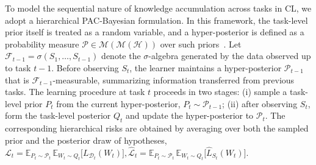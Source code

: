 \documentclass{article}
\theoremstyle{plain}
\theoremstyle{definition}
\theoremstyle{remark}
\begin{document}
To model the sequential nature of knowledge accumulation across tasks in CL, we adopt a hierarchical PAC‑Bayesian formulation. In this framework, the task-level prior itself is treated as a random variable, and a hyper-posterior is defined as a probability measure $\mathcal P \in \mathcal M(\mathcal M(\mathcal H))$ over such priors~\citep{pentinaPACBayesianBoundLifelong2014,JMLR:v24:22-1254}.
Let $\mathcal F_{t-1}=\sigma(S_1,\dots,S_{t-1})$ denote the $\sigma$-algebra generated by the data observed up to task $t-1$. 
Before observing $S_t$, the learner maintains a hyper-posterior $\mathcal P_{t-1}$ that is $\mathcal F_{t-1}$-measurable, summarizing information transferred from previous tasks. 
The learning procedure at task $t$ proceeds in two stages: (i) sample a task-level prior $P_t$ from the current hyper-posterior, $P_t\sim\mathcal P_{t-1}$; (ii) after observing $S_t$, form the task-level posterior $Q_t$ and update the hyper-posterior to $\mathcal P_t$. 
The corresponding hierarchical risks are obtained by averaging over both the sampled prior and the posterior draw of hypotheses,
$
\mathcal L_t
=
\mathbb E_{P_t \sim \mathcal P_t}
\,
\mathbb E_{W_t \sim Q_t}
\big[
L_{\mathcal D_t}(W_t)
\big],
\hat{\mathcal L}_t
=
\mathbb E_{P_t \sim \mathcal P_t}
\,
\mathbb E_{W_t \sim Q_t}
\big[
\hat L_{S_t}(W_t)
\big].
$
\end{document}
